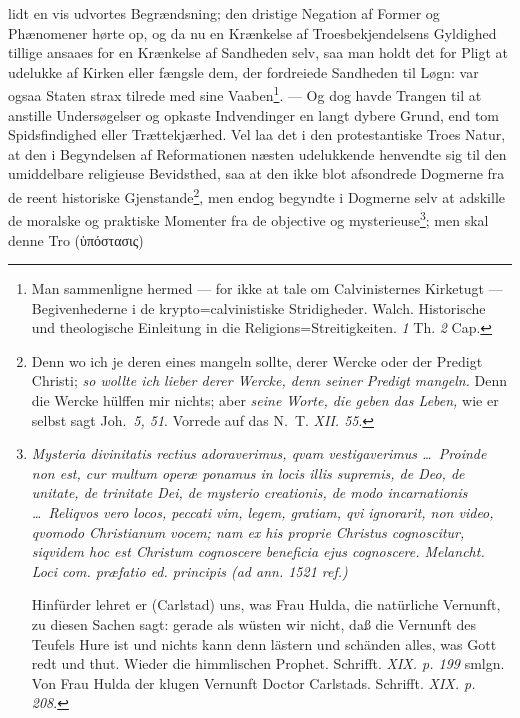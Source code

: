 \documentclass[12pt]{book}
\begin{document}
lidt en vis udvortes Begrændsning; den dristige Negation af Former og
Phænomener hørte op, og da nu en Krænkelse af Troesbekjendelsens Gyldighed
tillige ansaaes for en Krænkelse af Sandheden selv, saa man holdt det for
Pligt at udelukke af Kirken eller fængsle dem, der fordreiede Sandheden til
Løgn: var ogsaa Staten strax tilrede med sine Vaaben\footnote{Man sammenligne
hermed --- for ikke at tale om Calvinisternes Kirketugt --- Begivenhederne i
de krypto=calvinistiske Stridigheder. Walch. Historische und theologische
Einleitung in die Religions=Streitigkeiten. \textit{1} Th. \textit{2} Cap.}.
--- Og dog havde Trangen til at anstille Undersøgelser og opkaste
Indvendinger en langt dybere Grund, end tom Spidsfindighed eller
Trættekjærhed. Vel laa det i den protestantiske Troes Natur, at den i
Begyndelsen af Reformationen næsten udelukkende henvendte sig til den
umiddelbare religieuse Bevidsthed, saa at den ikke blot afsondrede Dogmerne
fra de reent historiske Gjenstande\footnote{Denn wo ich je deren eines
mangeln sollte, derer Wercke oder der Predigt Christi; \emph{so wollte ich
lieber derer Wercke, denn seiner Predigt mangeln.} Denn die Wercke hülffen
mir nichts; aber \emph{seine Worte, die geben das Leben,} wie er selbst sagt
Joh.~\textit{5, 51}. Vorrede auf das N.~T. \textit{XII. 55}.}, men endog
begyndte i Dogmerne selv at adskille de moralske og praktiske Momenter fra de
objective og mysterieuse\footnote{\textit{Mysteria divinitatis rectius
adoraverimus, qvam vestigaverimus \ldots\ Proinde non est, cur multum operæ
ponamus in locis illis supremis, de Deo, de unitate, de trinitate Dei, de
mysterio creationis, de modo incarnationis \ldots\ Reliqvos vero locos,
peccati vim, legem, gratiam, qvi ignorarit, non video, qvomodo Christianum
vocem; nam ex his proprie Christus cognoscitur, siqvidem hoc est Christum
cognoscere beneficia ejus cognoscere. Melancht. Loci com. præfatio ed.
principis (ad ann. 1521 ref.)}

Hinfürder lehret er (Carlstad) uns, was Frau Hulda, die natürliche Vernunft,
zu diesen Sachen sagt: gerade als wüsten wir nicht, daß die Vernunft des
Teufels Hure ist und nichts kann denn lästern und schänden alles, was Gott
redt und thut. Wieder die himmlischen Prophet. Schrifft. \textit{XIX. p.
199} smlgn. Von Frau Hulda der klugen Vernunft Doctor Carlstads. Schrifft.
\textit{XIX. p. 208}.}; men skal denne Tro (ὑπόστασις)
\end{document}
